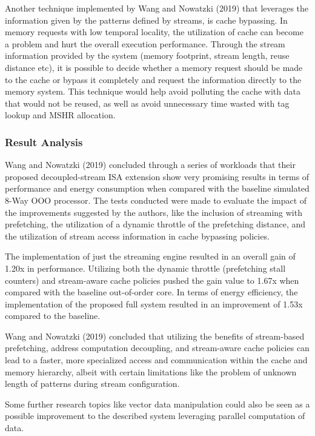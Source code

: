 Another technique implemented by Wang and Nowatzki (2019) \cite{8980305} that leverages the information given by the patterns defined by streams, is cache bypassing. In memory requests with low temporal locality, the utilization of cache can become a problem and hurt the overall execution performance. Through the stream information provided by the system (memory footprint, stream length, reuse distance etc), it is possible to decide whether a memory request should be made to the cache or bypass it completely and request the information directly to the memory system. This technique would help avoid polluting the cache with data that would not be reused, as well as avoid unnecessary time wasted with tag lookup and MSHR allocation.


\subsubsection{Result Analysis}

Wang and Nowatzki (2019) \cite{8980305} concluded through a series of workloads that their proposed decoupled-stream ISA extension show very promising results in terms of performance and energy consumption when compared with the baseline simulated 8-Way OOO processor. The tests conducted were made to evaluate the impact of the improvements suggested by the authors, like the inclusion of streaming with prefetching, the utilization of a dynamic throttle of the prefetching distance, and the utilization of stream access information in cache bypassing policies.

The implementation of just the streaming engine resulted in an overall gain of 1.20x in performance. Utilizing both the dynamic throttle (prefetching stall counters) and stream-aware cache policies pushed the gain value to 1.67x when compared with the baseline out-of-order core. In terms of energy efficiency, the implementation of the proposed full system resulted in an improvement of 1.53x compared to the baseline.

Wang and Nowatzki (2019) \cite{8980305} concluded that utilizing the benefits of stream-based prefetching, address computation decoupling, and stream-aware cache policies can lead to a faster, more specialized access and communication within the cache and memory hierarchy, albeit with certain limitations like the problem of unknown length of patterns during stream configuration.

Some further research topics like vector data manipulation could also be seen as a possible improvement to the described system leveraging parallel computation of data.


